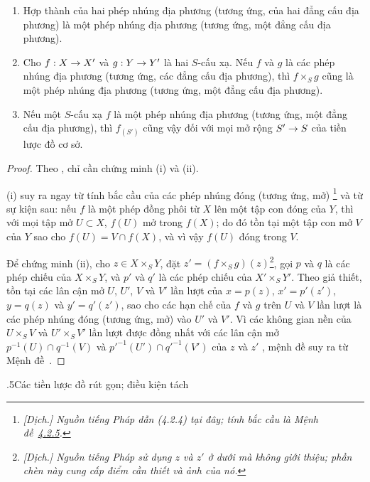 \documentclass[oneside]{amsart}
\makeatletter
\renewcommand*{\section}{%
  \@startsection{section}{1}{\z@}{.7\linespacing\@plus\linespacing}%
  {.5\linespacing}{\normalfont\bfseries\Large\scshape\centering}}
\newcommand{\ega@arrow}[2]{\mathchoice{#1}{#2}{#2}{#2}}
\renewcommand{\to}{\ega@arrow{\longrightarrow}{\rightarrow}}
\let\EGAOriginalLabel\label
\renewcommand{\label}[1]{\phantomsection\EGAOriginalLabel{#1}}
\makeatother
\begin{document}
\begin{proposition}[4.5.5]
\label{I.4.5.5}
\medskip\noindent
\begin{enumerate}
  \item[{\rm(i)}] Hợp thành của hai phép nhúng địa phương (tương ứng, của hai đẳng cấu địa phương) là một phép nhúng địa phương (tương ứng, một đẳng cấu địa phương).
  \item[{\rm(ii)}] Cho $f:X\to X'$ và $g:Y\to Y'$ là hai $S$-cấu xạ.
    Nếu $f$ và $g$ là các phép nhúng địa phương (tương ứng, các đẳng cấu địa phương), thì $f\times_S g$ cũng là một phép nhúng địa phương (tương ứng, một đẳng cấu địa phương).
  \item[{\rm(iii)}] Nếu một $S$-cấu xạ $f$ là một phép nhúng địa phương (tương ứng, một đẳng cấu địa phương), thì $f_{(S')}$ cũng vậy đối với mọi mở rộng $S'\to S$ của tiền lược đồ cơ sở.
\end{enumerate}
\end{proposition}

\begin{proof}
Theo , chỉ cần chứng minh (i) và (ii).

(i) suy ra ngay từ tính bắc cầu của các phép nhúng đóng (tương ứng, mở) \footnote{\emph{[Dịch.] Nguồn tiếng Pháp dẫn (4.2.4) tại đây; tính bắc cầu là Mệnh đề~\hyperref[I.4.2.5]{4.2.5}.}} và từ sự kiện sau: nếu $f$ là một phép đồng phôi từ $X$ lên một tập con đóng của $Y$, thì với mọi tập mở $U\subset X$, $f(U)$ mở trong $f(X)$; do đó tồn tại một tập con mở $V$ của $Y$ sao cho $f(U)=V\cap f(X)$, và vì vậy $f(U)$ đóng trong $V$.

Để chứng minh (ii), cho $z\in X\times_S Y$, đặt $z'=(f\times_S g)(z)$\footnote{\emph{[Dịch.] Nguồn tiếng Pháp sử dụng $z$ và $z'$ ở dưới mà không giới thiệu; phần chèn này cung cấp điểm cần thiết và ảnh của nó.}}, gọi $p$ và $q$ là các phép chiếu của $X\times_S Y$, và $p'$ và $q'$ là các phép chiếu của $X'\times_S Y'$.
Theo giả thiết, tồn tại các lân cận mở $U$, $U'$, $V$ và $V'$ lần lượt của $x=p(z)$, $x'=p'(z')$, $y=q(z)$ và $y'=q'(z')$, sao cho các hạn chế của $f$ và $g$ trên $U$ và $V$ lần lượt là các phép nhúng đóng (tương ứng, mở) vào $U'$ và $V'$.
Vì các không gian nền của $U\times_S V$ và $U'\times_S V'$ lần lượt được đồng nhất với các lân cận mở $p^{-1}(U)\cap q^{-1}(V)$ và ${p'}^{-1}(U')\cap{q'}^{-1}(V')$ của $z$ và $z'$ , mệnh đề suy ra từ Mệnh đề~.
\end{proof}

\section{Các tiền lược đồ rút gọn; điều kiện tách}
\label{section:I.5}
\end{document}
